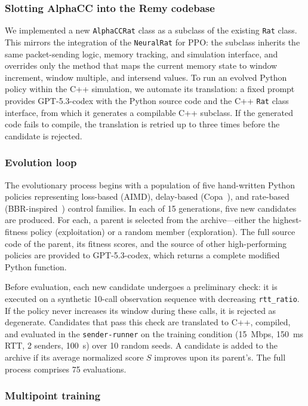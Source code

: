 \subsubsection{Slotting AlphaCC into the Remy codebase}

We implemented a new \texttt{AlphaCCRat} class as a subclass of the
existing \texttt{Rat} class. This mirrors the integration of the
\texttt{NeuralRat} for PPO: the subclass inherits the same
packet-sending logic, memory tracking, and simulation interface, and
overrides only the method that maps the current memory state to window
increment, window multiple, and intersend values. To run an evolved
Python policy within the C++ simulation, we automate its translation:
a fixed prompt provides GPT-5.3-codex with the Python source code and
the C++ \texttt{Rat} class interface, from which it generates a
compilable C++ subclass. If the generated code fails to compile, the
translation is retried up to three times before the candidate is
rejected.

\subsubsection{Evolution loop}

The evolutionary process begins with a population of five hand-written
Python policies representing loss-based
(AIMD), delay-based (Copa~\cite{arun2018copa}), and rate-based
(BBR-inspired~\cite{cardwell2017bbr}) control families. In each of
15 generations, five new candidates are produced. For each, a parent
is selected from the archive---either the highest-fitness policy
(exploitation) or a random member (exploration). The full source code
of the parent, its fitness scores, and the source of other
high-performing policies are provided to GPT-5.3-codex, which returns
a complete modified Python function.

Before evaluation, each new candidate undergoes a preliminary check:
it is executed on a synthetic 10-call observation sequence with
decreasing \texttt{rtt\_ratio}. If the policy never increases its
window during these calls, it is rejected as degenerate. Candidates
that pass this check are translated to C++, compiled, and evaluated
in the \texttt{sender-runner} on the training condition (15~Mbps,
150~ms RTT, 2 senders, 100~s) over 10 random seeds. A candidate is
added to the archive if its average normalized score $S$ improves
upon its parent's. The full process comprises 75 evaluations.

\subsubsection{Multipoint training}

